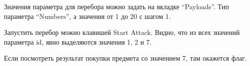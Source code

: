 
Значения параметра для перебора можно задать на вкладке “Payloads”.  Тип параметра “Numbers”, а значения от 1 до 20 с шагом 1.


Запустить перебор можно клавишей Start Attack. Видно, что из всех значений параметра id, явно выделяются значения 1, 2 и 7. 


Если посмотреть результат покупки предмета со значением 7, там окажется флаг.


